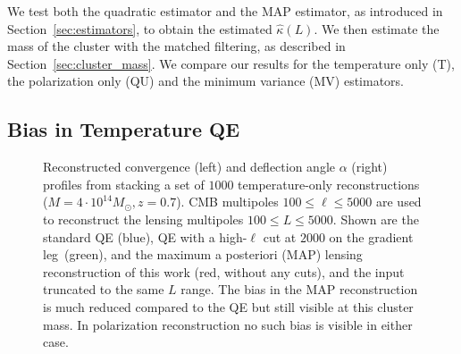 \documentclass[prd, superscriptaddress, tightenlines, longbibliography, nofootinbib, eqsecnum, amsfonts, amsmath, floatfix, twocolumn, notitlepage]{revtex4-2}
\newcommand{\LL}[1]{{\color{orange}{LL: #1}}}
\begin{document}
We test both the quadratic estimator and the MAP estimator, as introduced in Section~\ref{sec:estimators}, to obtain the estimated $\hat{\kappa}(L)$.
We then estimate the mass of the cluster with the matched filtering, as described in Section~\ref{sec:cluster_mass}. We compare our results for the temperature only (T), the polarization only (QU) and the minimum variance (MV) estimators.


\subsection{Bias in Temperature QE}

\begin{figure}
  \caption{Reconstructed convergence (left) and deflection angle $\alpha$ (right) profiles from  stacking a set of $1000$ temperature-only reconstructions ($M = 4 \cdot 10^{14} M_\odot, z=0.7$). CMB multipoles $100 \leq \ell \leq 5000$ are used to reconstruct the lensing multipoles $100 \leq L \leq 5000$. Shown are the standard QE (blue), QE with a high-$\ell$ cut at $2000$ on the gradient leg~\cite{Hu:2007bt}(green), and the maximum a posteriori (MAP) lensing reconstruction of this work (red, without any cuts), and the input truncated to the same $L$ range. The bias in the MAP reconstruction is much reduced compared to the QE but still visible at this cluster mass. In polarization reconstruction no such bias is visible in either case.}
  \label{fig:Bias_sup}
  \end{figure}
\end{document}
